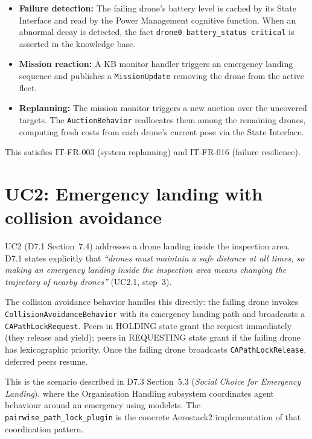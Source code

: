 \documentclass[deliverable]{csreport}
\renewcommand{\code}[1]{\texttt{\textcolor{CSMaroon}{#1}}}%
\begin{document}
\begin{itemize}
  \item \textbf{Failure detection:} The failing drone's battery level is cached by its State Interface and read by the Power Management cognitive function. When an abnormal decay is detected, the fact \code{drone0 battery\_status critical} is asserted in the knowledge base.
  \item \textbf{Mission reaction:} A KB monitor handler triggers an emergency landing sequence and publishes a \code{MissionUpdate} removing the drone from the active fleet.
  \item \textbf{Replanning:} The mission monitor triggers a new auction over the uncovered targets. The \code{AuctionBehavior} reallocates them among the remaining drones, computing fresh costs from each drone's current pose via the State Interface.
\end{itemize}

This satisfies IT-FR-003 (system replanning) and IT-FR-016 (failure resilience).

\section{UC2: Emergency landing with collision avoidance}

UC2 (D7.1 Section~7.4) addresses a drone landing inside the inspection area. D7.1 states explicitly that \emph{``drones must maintain a safe distance at all times, so making an emergency landing inside the inspection area means changing the trajectory of nearby drones''} (UC2.1, step~3).

The collision avoidance behavior handles this directly: the failing drone invokes \\\code{CollisionAvoidanceBehavior} with its emergency landing path and broadcasts a \\\code{CAPathLockRequest}. Peers in HOLDING state grant the request immediately (they release and yield); peers in REQUESTING state grant if the failing drone has lexicographic priority. Once the failing drone broadcasts \code{CAPathLockRelease}, deferred peers resume.

This is the scenario described in D7.3 Section~5.3 (\emph{Social Choice for Emergency Landing}), where the Organisation Handling subsystem coordinates agent behaviour around an emergency using modelets. The \code{pairwise\_path\_lock\_plugin} is the concrete Aerostack2 implementation of that coordination pattern.

\end{document}
